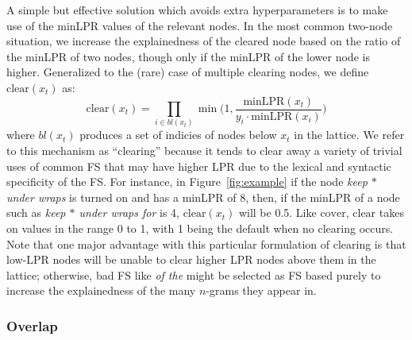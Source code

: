 \documentclass[11pt,letterpaper]{article}
\newcommand{\gap}{$*$\xspace}
\newcommand{\ex}[1]{\textit{#1}\xspace}
\newcommand{\minLPR}{\ensuremath{\text{minLPR}}}
\newcommand{\cover}{\ensuremath{\text{cover}}\xspace}
\newcommand{\clear}{\ensuremath{\text{clear}}\xspace}
\newcommand{\figref}[2][]{Figure#1~\ref{#2}\xspace}
\begin{document}
A simple but effective solution which avoids extra hyperparameters is to make use of the minLPR values of the relevant nodes. In the most common two-node situation, we increase the explainedness of the cleared node based on the ratio of the minLPR of two nodes, though only if the minLPR of the lower node is higher. Generalized to the (rare) case of multiple clearing nodes, we define $\clear(x_t)$ as:
\begin{displaymath}
\clear(x_t) = \prod_{i \in bl(x_t)}{\min\Big(1,\frac{\minLPR(x_t)}{y_i\cdot\minLPR(x_i)}\Big)}
\end{displaymath}
where $bl(x_t)$ produces a set of indicies of nodes below $x_t$ in the lattice. We refer to this mechanism as ``clearing'' because it tends to clear away a variety of trivial uses of common FS that may have higher LPR due to the lexical and syntactic specificity of the FS. For instance, in \figref{fig:example} if the node \ex{keep \gap under wraps}  is turned on and has a minLPR of 8, then, if the minLPR of a node such as \ex{keep \gap under wraps for} is 4, $\clear(x_t)$ will be 0.5. Like \cover, \clear takes on values in the range 0 to 1, with 1 being the default when no clearing occurs. Note that one major advantage with this particular formulation of clearing is that low-LPR nodes will be unable to clear higher LPR nodes above them in the lattice; otherwise, bad FS like \ex{of the} might be selected as FS based purely to increase the explainedness of the many $n$-grams they appear in.



\subsubsection{Overlap}
\end{document}
